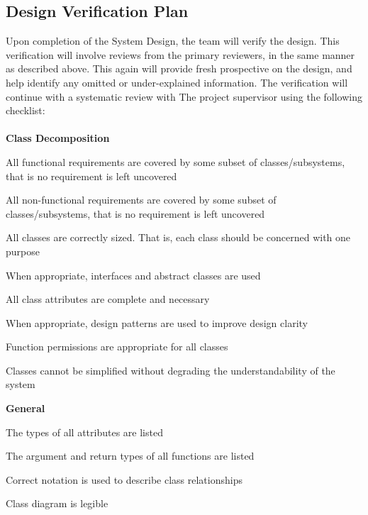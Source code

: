 \documentclass[12pt, titlepage]{article}
\begin{document}


\subsection{Design Verification Plan}
Upon completion of the System Design, the team will verify the design. This verification will involve reviews from the primary reviewers, in the same manner as described above.
This again will provide fresh prospective on the design, and help identify any omitted or under-explained information. The verification will continue with a systematic review with The
project supervisor using the following checklist:\\\\

\textbf{Class Decomposition}\\
\begin{todolist}
  \item All functional requirements are covered by some subset of classes/subsystems, that is no requirement is left uncovered
  \item All non-functional requirements are covered by some subset of classes/subsystems, that is no requirement is left uncovered
  \item All classes are correctly sized. That is, each class should be concerned with one purpose
  \item When appropriate, interfaces and abstract classes are used
  \item All class attributes are complete and necessary
  \item When appropriate, design patterns are used to improve design clarity
  \item Function permissions are appropriate for all classes
  \item Classes cannot be simplified without degrading the understandability of the system
  \end{todolist}
  \textbf{General}\\
\begin{todolist}
  \item The types of all attributes are listed
  \item The argument and return types of all functions are listed
  \item Correct notation is used to describe class relationships
  \item Class diagram is legible
  \end{todolist}
\end{document}
